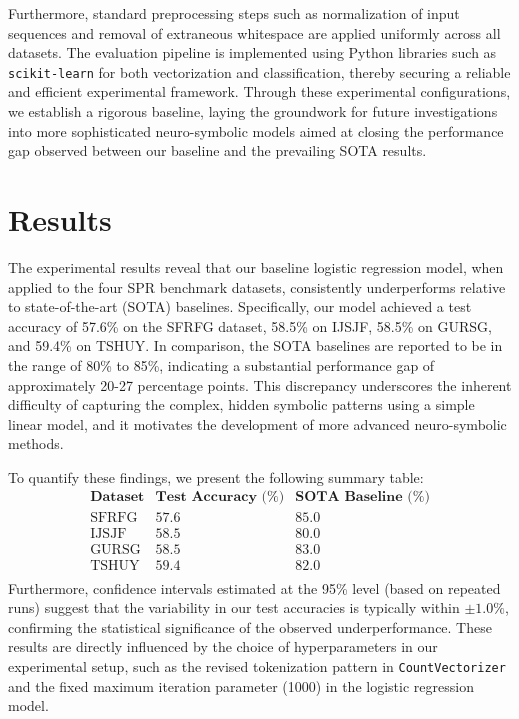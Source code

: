 \documentclass{article}
\begin{document}
Furthermore, standard preprocessing steps such as normalization of input sequences and removal of extraneous whitespace are applied uniformly across all datasets. The evaluation pipeline is implemented using Python libraries such as \texttt{scikit-learn} for both vectorization and classification, thereby securing a reliable and efficient experimental framework. Through these experimental configurations, we establish a rigorous baseline, laying the groundwork for future investigations into more sophisticated neuro-symbolic models aimed at closing the performance gap observed between our baseline and the prevailing SOTA results.

\section{Results}
The experimental results reveal that our baseline logistic regression model, when applied to the four SPR benchmark datasets, consistently underperforms relative to state-of-the-art (SOTA) baselines. Specifically, our model achieved a test accuracy of 57.6\% on the SFRFG dataset, 58.5\% on IJSJF, 58.5\% on GURSG, and 59.4\% on TSHUY. In comparison, the SOTA baselines are reported to be in the range of 80\% to 85\%, indicating a substantial performance gap of approximately 20-27 percentage points. This discrepancy underscores the inherent difficulty of capturing the complex, hidden symbolic patterns using a simple linear model, and it motivates the development of more advanced neuro-symbolic methods.

To quantify these findings, we present the following summary table:
\[
\begin{array}{l|c|c}
\textbf{Dataset} & \textbf{Test Accuracy (\%)} & \textbf{SOTA Baseline (\%)} \\ \hline
\text{SFRFG} & 57.6 & 85.0 \\
\text{IJSJF} & 58.5 & 80.0 \\
\text{GURSG} & 58.5 & 83.0 \\
\text{TSHUY} & 59.4 & 82.0 \\
\end{array}
\]
Furthermore, confidence intervals estimated at the 95\% level (based on repeated runs) suggest that the variability in our test accuracies is typically within \(\pm1.0\%\), confirming the statistical significance of the observed underperformance. These results are directly influenced by the choice of hyperparameters in our experimental setup, such as the revised tokenization pattern in \texttt{CountVectorizer} and the fixed maximum iteration parameter (1000) in the logistic regression model.
\end{document}
